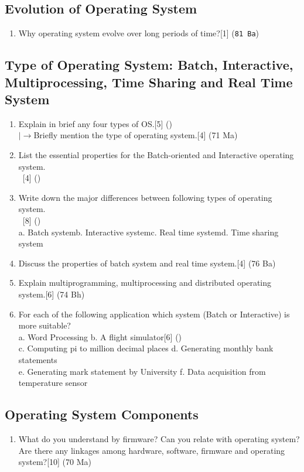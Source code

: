 \documentclass[12pt]{article}
\newcommand{\lb}{\\$\left|\rightarrow\right.$}
\newcommand{\enter}{\\\textcolor{white}{1}}
\begin{document}
	\subsection{Evolution of Operating System}
	\begin{enumerate}
	\item Why operating system evolve over long periods of time?\hfill[1] (\texttt{81 Ba})
	\end{enumerate}
	\subsection{Type of Operating System: Batch, Interactive, Multiprocessing, Time Sharing and Real Time System}
	\begin{enumerate}
	\item Explain in brief any four types of OS.\hfill[5] ()
	\lb Briefly mention the type of operating system.\hfill[4] (71 Ma)
	\item List the essential properties for the Batch-oriented and Interactive operating system.
	\enter\hfill[4] ()
	\item Write down the major differences between following types of operating system.
	\enter\hfill[8] ()\\
	a. Batch system\hspace{7mm}b. Interactive system\hspace{7mm}c. Real time system\hspace{7mm}d. Time sharing system
	\item Discuss the properties of batch system and real time system.\hfill[4] (76 Ba)
	\item Explain multiprogramming, multiprocessing and distributed operating system.\hfill[6] (74 Bh)
	\item For each of the following application which system (Batch or Interactive) is more suitable?\\
	a. Word Processing \hspace{5cm}b. A flight simulator\hfill[6] ()\\
	c. Computing pi to million decimal places\hspace{9mm} d. Generating monthly bank statements\\ 
	e. Generating mark statement by University \hspace{7mm}f. Data acquisition from temperature sensor
	\end{enumerate}
	\subsection{Operating System Components}
	\begin{enumerate}
	\item What do you understand by firmware? Can you relate with operating system? Are there any linkages among hardware, software, firmware and operating system?\hfill[10] (70 Ma)
	\end{enumerate}
\end{document}
